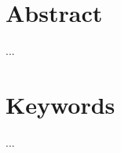 \chapter*{Abstract}

...

\begingroup %
\renewcommand{\cleardoublepage}{}
\renewcommand{\clearpage}{}
\chapter*{Keywords}
\endgroup

...
